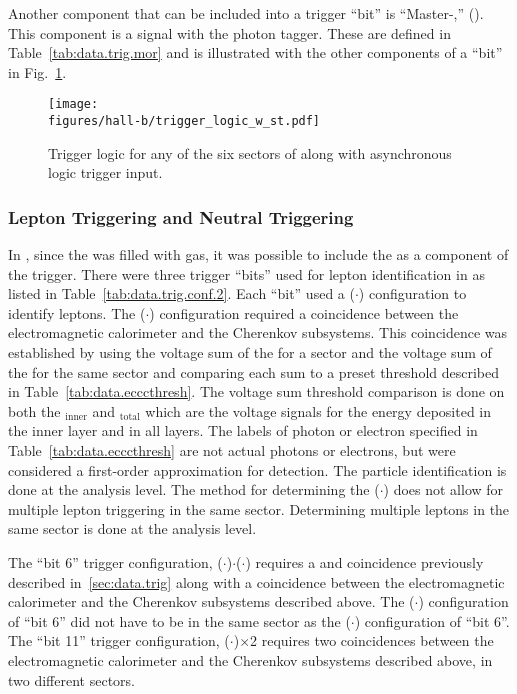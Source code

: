	Another component that can be included into a trigger ``bit'' is ``Master-,'' (). This component is a signal with the photon tagger. These are defined in Table~\ref{tab:data.trig.mor} and is illustrated with the other components of a ``bit'' in Fig.~\ref{fig:clas.daq.triglogic}.
	\begin{figure}[h]\begin{center}
			\texttt{[image: \\figures/hall-b/trigger\_logic\_w\_st.pdf]}
			\caption[Trigger logic for any of the six sectors of  along with  asynchronous logic trigger input]{\label{fig:clas.daq.triglogic}{}Trigger logic for any of the six sectors of  along with  asynchronous logic trigger input.}
		\end{center}\end{figure}
		
		\subsubsection{Lepton Triggering and Neutral Triggering}\label{sec.data.trig.lepton}
		In , since the  was filled with gas, it was possible to include the  as a component of the trigger. 
		There were three trigger ``bits'' used for lepton identification in  as listed in Table~\ref{tab:data.trig.conf.2}. Each ``bit'' used a ($\cdot$) configuration to identify leptons. The ($\cdot$) configuration required a coincidence between the electromagnetic calorimeter and the Cherenkov subsystems. This coincidence was established by using the voltage sum of the  for a sector and the voltage sum of the  for the same sector and comparing each sum to a preset threshold described in Table~\ref{tab:data.ecccthresh}. The  voltage sum threshold comparison is done on both the $_\mathrm{inner}$ and $_{\mathrm{total}}$ which are the  voltage signals for the energy deposited in the inner layer and in all layers. The labels of photon or electron specified in Table~\ref{tab:data.ecccthresh} are not actual photons or electrons, but were considered a first-order approximation for detection. The particle identification is done at the analysis level. The method for determining the ($\cdot$) does not allow for multiple lepton triggering in the same sector. Determining multiple leptons in the same sector is done at the analysis level. 
		
		The ``bit 6'' trigger configuration, ($\cdot$)$\cdot$($\cdot$) requires a  and  coincidence previously described in~\ref{sec:data.trig} along with a coincidence between the electromagnetic calorimeter and the Cherenkov subsystems described above. The ($\cdot$) configuration of ``bit 6'' did not have to be in the same sector as the ($\cdot$) configuration of ``bit 6''. The ``bit 11'' trigger configuration, ($\cdot$)$\times$2 requires two coincidences between the electromagnetic calorimeter and the Cherenkov subsystems described above, in two different sectors. 
		
